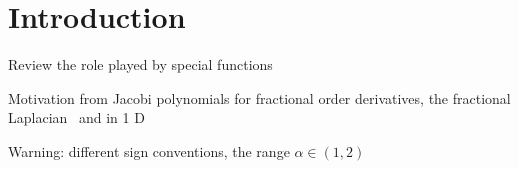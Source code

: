 \section{Introduction}

Review the role played by special functions

Motivation from Jacobi polynomials for fractional order derivatives,
the fractional Laplacian~\cite{MR3640641}
and in 1 D~\cite{MR3787393}

Warning: different sign conventions, the range $\alpha \in (1,2)$
